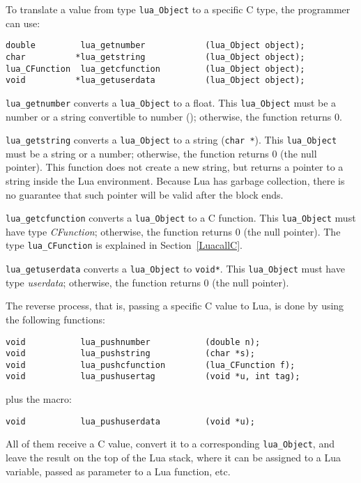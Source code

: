 To translate a value from type \verb'lua_Object' to a specific C type,
the programmer can use:
\begin{verbatim}
double         lua_getnumber            (lua_Object object);
char          *lua_getstring            (lua_Object object);
lua_CFunction  lua_getcfunction         (lua_Object object);
void          *lua_getuserdata          (lua_Object object);
\end{verbatim}
\verb'lua_getnumber' converts a \verb'lua_Object' to a float.
This \verb'lua_Object' must be a number or a string convertible to number
(); otherwise, the function returns 0.

\verb'lua_getstring' converts a \verb'lua_Object' to a string (\verb'char *').
This \verb'lua_Object' must be a string or a number;
otherwise, the function returns 0 (the null pointer).
This function does not create a new string, but returns a pointer to
a string inside the Lua environment.
Because Lua has garbage collection, there is no guarantee that such
pointer will be valid after the block ends.

\verb'lua_getcfunction' converts a \verb'lua_Object' to a C function.
This \verb'lua_Object' must have type {\em CFunction\/};
otherwise, the function returns 0 (the null pointer).
The type \verb'lua_CFunction' is explained in Section~\ref{LuacallC}.

\verb'lua_getuserdata' converts a \verb'lua_Object' to \verb'void*'.
This \verb'lua_Object' must have type {\em userdata\/};
otherwise, the function returns 0 (the null pointer).

The reverse process, that is, passing a specific C value to Lua,
is done by using the following functions:
\begin{verbatim}
void           lua_pushnumber           (double n);
void           lua_pushstring           (char *s);
void           lua_pushcfunction        (lua_CFunction f);
void           lua_pushusertag          (void *u, int tag);
\end{verbatim}
plus the macro:
\begin{verbatim}
void           lua_pushuserdata         (void *u);
\end{verbatim}
All of them receive a C value,
convert it to a corresponding \verb'lua_Object',
and leave the result on the top of the Lua stack,
where it can be assigned to a Lua variable,
passed as parameter to a Lua function, etc. \label{pushing}

